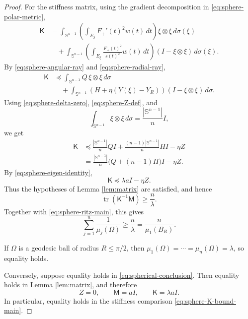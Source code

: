 \documentclass[10pt,a4paper]{amsart}
\DeclareMathOperator{\tr}{tr}
\newcommand{\Sn}{\mathbb S}
\newcommand{\Id}{I}
\newcommand{\mcM}{\mathsf M}
\newcommand{\mcK}{\mathsf K}
\begin{document}
\begin{proof}
For the stiffness matrix, using the gradient decomposition in \eqref{eq:sphere-polar-metric},
\begin{align*}
        \mcK
        &=\int_{\Sn^{n-1}}
        \left(\int_{E_\xi}F_+'(t)^2w(t)\,dt\right)
        \xi\otimes\xi\,d\sigma(\xi)\\
        &\quad+
        \int_{\Sn^{n-1}}
        \left(\int_{E_\xi}\frac{F_+(t)^2}{s(t)^2}w(t)\,dt\right)
        (\Id-\xi\otimes\xi)\,d\sigma(\xi).
\end{align*}
By \eqref{eq:sphere-angular-ray} and \eqref{eq:sphere-radial-ray},
\begin{align*}
        \mcK
        &\preceq
        \int_{\Sn^{n-1}}Q\,\xi\otimes\xi\,d\sigma\\
        &\quad+
        \int_{\Sn^{n-1}}
        \left(H+\eta(Y(\xi)-Y_R)\right)
        (\Id-\xi\otimes\xi)\,d\sigma.
\end{align*}
Using \eqref{eq:sphere-delta-zero}, \eqref{eq:sphere-Z-def}, and
$$
        \int_{\Sn^{n-1}}\xi\otimes\xi\,d\sigma=\frac{|\Sn^{n-1}|}{n}\Id,
$$
we get
\begin{align*}
        \mcK
        &\preceq
        \frac{|\Sn^{n-1}|}{n}Q\Id
        +\frac{(n-1)|\Sn^{n-1}|}{n}H\Id
        -\eta Z\\
        &=\frac{|\Sn^{n-1}|}{n}\bigl(Q+(n-1)H\bigr)\Id-\eta Z.
\end{align*}
By \eqref{eq:sphere-eigen-identity},
\begin{equation}\label{eq:sphere-K-bound-main}
        \mcK\preceq \lambda a\Id-\eta Z.
\end{equation}
Thus the hypotheses of Lemma \ref{lem:matrix} are satisfied, and hence
\begin{equation}\label{eq:sphere-trace-lower}
        \tr(\mcK^{-1}\mcM)\ge \frac{n}{\lambda}.
\end{equation}
Together with \eqref{eq:sphere-ritz-main}, this gives
$$
        \sum_{j=1}^n\frac1{\mu_j(\Omega)}
        \ge \frac{n}{\lambda}
        =\frac{n}{\mu_1(B_R)}.
$$

If $\Omega$ is a geodesic ball of radius $R\le\pi/2$, then $\mu_1(\Omega)=\cdots=\mu_n(\Omega)=\lambda$, so equality holds.

Conversely, suppose equality holds in \eqref{eq:spherical-conclusion}.  Then equality holds in Lemma \ref{lem:matrix}, and therefore
\begin{equation}\label{eq:sphere-equality-MKZ}
        Z=0,
        \qquad
        \mcM=a\Id,
        \qquad
        \mcK=\lambda a\Id.
\end{equation}
In particular, equality holds in the stiffness comparison \eqref{eq:sphere-K-bound-main}.


\end{proof}
\end{document}
